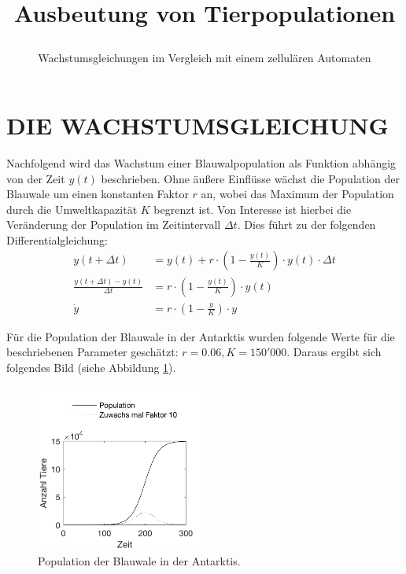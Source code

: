 \documentclass[a4paper,twoside]{article}
\begin{document}
	\title{Ausbeutung von Tierpopulationen\subtitle{Wachstumsgleichungen im Vergleich mit einem zellulären Automaten} }
	
	\author{}
	

	
	\onecolumn \maketitle \normalsize \vfill

	\section{\uppercase{Die Wachstumsgleichung}}\label{sec:Wachstumsgleichung}

	\noindent Nachfolgend wird das Wachstum einer Blauwalpopulation als Funktion abhängig von der Zeit \(y(t)\) beschrieben. Ohne äußere Einflüsse wächst die Population der Blauwale um einen konstanten Faktor \(r\) an, wobei das Maximum der Population durch die Umweltkapazität \(K\) begrenzt ist. Von Interesse ist hierbei die Veränderung der Population im Zeitintervall \(\Delta t\). Dies führt zu der folgenden Differentialgleichung:
	\begin{align*}
		y(t+\Delta t) &= y(t) + r\cdot\left(1-\frac{y(t)}{K}\right) \cdot y(t) \cdot \Delta t \\
		\frac{y(t+\Delta t) - y(t)}{\Delta t} &= r \cdot\left(1-\frac{y(t)}{K}\right) \cdot y(t) \\
		\dot{y} &= r \cdot\left(1-\frac{y}{K}\right) \cdot y
	\end{align*}

	Für die Population der Blauwale in der Antarktis \cite{Skript} wurden folgende Werte für die beschriebenen Parameter geschätzt: \(r = 0.06, K = 150'000\). Daraus ergibt sich folgendes Bild (siehe Abbildung \ref{fig:wachstum_ohne_einfluesse}).
	
	\begin{figure}[!h]
  		\centering
 		\includegraphics[width=5.5cm]{Diagramme/wachstum_ohne_einfluesse.png}
  		\caption{Population der Blauwale in der Antarktis.}
  		\label{fig:wachstum_ohne_einfluesse}
	\end{figure}
\end{document}
